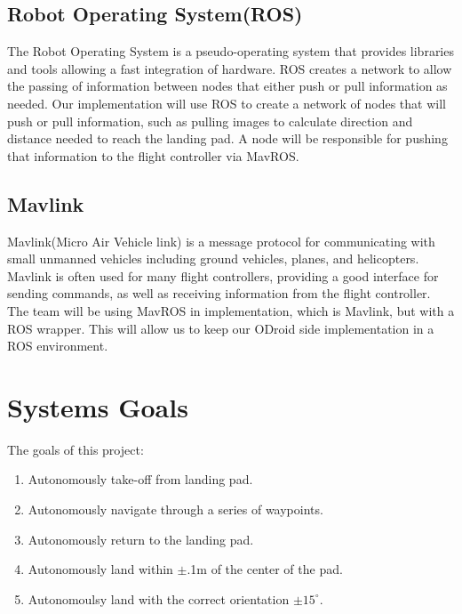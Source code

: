 \subsection{Robot Operating System(ROS)}
The Robot Operating System is a pseudo-operating system that provides libraries and tools allowing a fast integration of hardware. ROS creates a network to allow the passing of information between nodes that either push or pull information as needed. Our implementation will use ROS to create a network of nodes that will push or pull information, such as pulling images to calculate direction and distance needed to reach the landing pad. A node will be responsible for pushing that information to the flight controller via MavROS.

\subsection{Mavlink}
Mavlink(Micro Air Vehicle link) is a message protocol for communicating with small unmanned vehicles including ground vehicles, planes, and helicopters. Mavlink is often used for many flight controllers, providing a good interface for sending commands, as well as receiving information from the flight controller. The team will be using MavROS in implementation, which is Mavlink, but with a ROS wrapper. This will allow us to keep our ODroid side implementation in a ROS environment.

\section{Systems Goals}
The goals of this project:
\begin{enumerate}
\item Autonomously take-off from landing pad.
\item Autonomously navigate through a series of waypoints.
\item Autonomously return to the landing pad.
\item Autonomously land within $\pm$.1m of the center of the pad.
\item Autonomoulsy land with the correct orientation $\pm 15^{\circ}$.
\end{enumerate}

